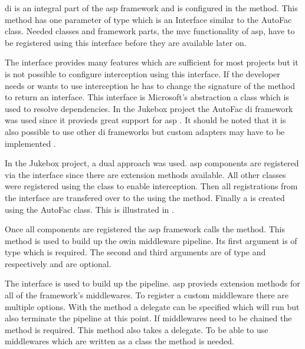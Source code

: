 \gls{di} is an integral part of the \gls{asp} framework and is configured in the  method. This method has one parameter of type  which is an Interface similar to the AutoFac  class. Needed classes and framework parts, \zB the \gls{mvc} functionality of \gls{asp}, have to be registered using this interface before they are available later on.

The  interface provides many features which are sufficient for most projects but it is not possible to configure interception using this interface. If the developer needs or wants to use interception he has to change the signature of the  method to return an  interface. This interface is Microsoft's abstraction a  class which is used to resolve dependencies. In the Jukebox project the AutoFac \gls{di} framework was used since it provieds great support for \gls{asp} \cite{autofacCoreDoc}. It should be noted that it is also possible to use other \gls{di} frameworks but custom adapters may have to be implemented \cite{aspCustomDI}.

In the Jukebox project, a dual approach was used. \gls{asp} components are registered via the  interface since there are extension methods available. All other classes were registered using the  class to enable interception. Then all registrations from the  interface are transfered over to the  using the  method. Finally a  is created using the AutoFac  class. This is illustrated in .


Once all components are registered the \gls{asp} framework calls the  method. This method is used to build up the \gls{owin} middleware pipeline. Its first argument is of type  which is required. The second and third arguments are of type  and  respectively and are optional.

The  interface is used to build up the pipeline. \gls{asp} provieds extension methods for all of the framework's middlewares. To register a custom middleware there are multiple options. With the  method a delegate can be specified which will run but also terminate the pipeline at this point. If middlewares need to be chained the  method is required. This method also takes a delegate. To be able to use middlewares which are written as a class the  method is needed. \cite{aspMiddleware}

